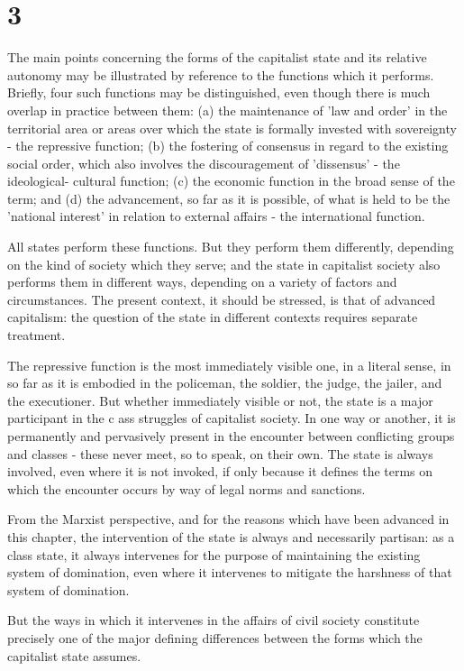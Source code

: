 \section*{3}
The main points concerning the forms of the capitalist state and its relative autonomy may be illustrated by reference to the functions which it performs. Briefly, four such functions may be distinguished, even though there is much overlap in practice between them: (a) the maintenance of 'law and order' in the territorial area or areas over which the state is formally invested with sovereignty - the repressive function; (b) the fostering of consensus in regard to the existing social order, which also involves the discouragement of 'dissensus' - the ideological- cultural function; (c) the economic function in the broad sense of the term; and (d) the advancement, so far as it is possible, of what is held to be the 'national interest' in relation to external affairs - the international function.

All states perform these functions. But they perform them differently, depending on the kind of society which they serve; and the state in capitalist society also performs them in different ways, depending on a variety of factors and circumstances. The present context, it should be stressed, is that of advanced capitalism: the question of the state in different contexts requires separate treatment.

The repressive function is the most immediately visible one, in a literal sense, in so far as it is embodied in the policeman, the soldier, the judge, the jailer, and the executioner. But whether immediately visible or not, the state is a major participant in the c ass struggles of capitalist society. In one way or another, it is permanently and pervasively present in the encounter between conflicting groups and classes - these never meet, so to speak, on their own. The state is always involved, even where it is not invoked, if only because it defines the terms on which the encounter occurs by way of legal norms and sanctions.

From the Marxist perspective, and for the reasons which have been advanced in this chapter, the intervention of the state is always and necessarily partisan: as a class state, it always intervenes for the purpose of maintaining the existing system of domination, even where it intervenes to mitigate the harshness of that system of domination.

But the ways in which it intervenes in the affairs of civil society constitute precisely one of the major defining differences between the forms which the capitalist state assumes.

